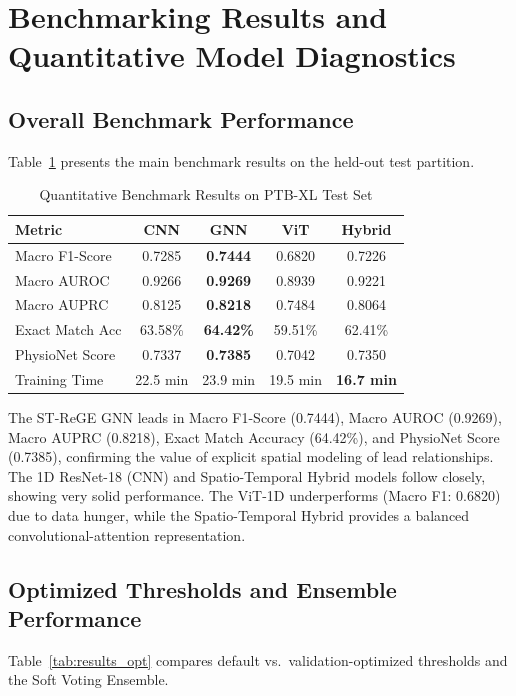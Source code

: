 \documentclass[14pt]{extarticle}
\begin{document}
\section{Benchmarking Results and Quantitative Model Diagnostics}
\label{sec:results}

\subsection{Overall Benchmark Performance}
Table~\ref{tab:results_main} presents the main benchmark results on the held-out test partition.

\begin{table}[H]
\caption{Quantitative Benchmark Results on PTB-XL Test Set}
\label{tab:results_main}
\centering
\begin{tabular}{|l|c|c|c|c|}
\hline
\textbf{Metric} & \textbf{CNN} & \textbf{GNN} & \textbf{ViT} & \textbf{Hybrid} \\
\hline
Macro F1-Score   & 0.7285 & \textbf{0.7444} & 0.6820 & 0.7226 \\
Macro AUROC      & 0.9266 & \textbf{0.9269} & 0.8939 & 0.9221 \\
Macro AUPRC      & 0.8125 & \textbf{0.8218} & 0.7484 & 0.8064 \\
Exact Match Acc  & 63.58\% & \textbf{64.42\%} & 59.51\% & 62.41\% \\
PhysioNet Score  & 0.7337 & \textbf{0.7385} & 0.7042 & 0.7350 \\
Training Time    & 22.5 min & 23.9 min & 19.5 min & \textbf{16.7 min} \\
\hline
\end{tabular}
\end{table}

The ST-ReGE GNN leads in Macro F1-Score (0.7444), Macro AUROC (0.9269), Macro AUPRC (0.8218), Exact Match Accuracy (64.42\%), and PhysioNet Score (0.7385), confirming the value of explicit spatial modeling of lead relationships. The 1D ResNet-18 (CNN) and Spatio-Temporal Hybrid models follow closely, showing very solid performance. The ViT-1D underperforms (Macro F1: 0.6820) due to data hunger, while the Spatio-Temporal Hybrid provides a balanced convolutional-attention representation.

\subsection{Optimized Thresholds and Ensemble Performance}
Table~\ref{tab:results_opt} compares default vs.\ validation-optimized thresholds and the Soft Voting Ensemble.
\end{document}
